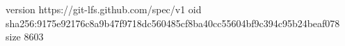 version https://git-lfs.github.com/spec/v1
oid sha256:9175e92176c8a9b47f9718dc560485cf8ba40cc55604bf9c394c95b24beaf078
size 8603
